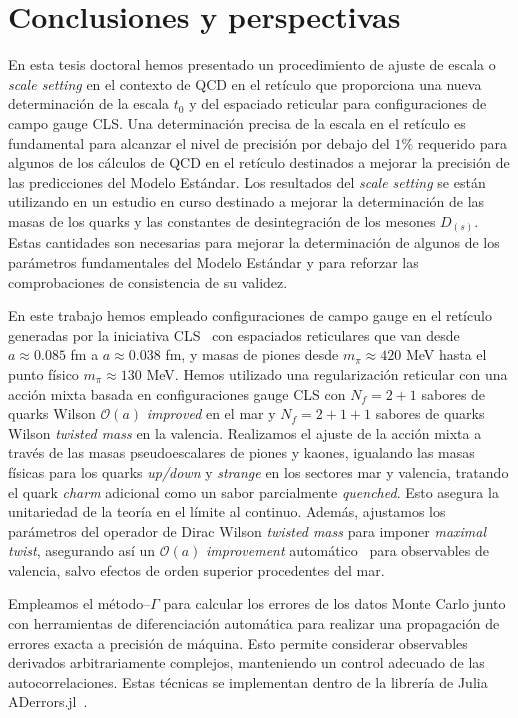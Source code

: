 \chapter*{Conclusiones y perspectivas}

En esta tesis doctoral hemos presentado un procedimiento de ajuste de escala o \textit{scale setting} en el contexto de QCD en el retículo que proporciona una nueva determinación de la escala $t_0$ y del espaciado reticular para configuraciones de campo gauge CLS. Una determinación precisa de la escala en el retículo es fundamental para alcanzar el nivel de precisión por debajo del $1\%$ requerido para algunos de los cálculos de QCD en el retículo destinados a mejorar la precisión de las predicciones del Modelo Estándar. Los resultados del \textit{scale setting} se están utilizando en un estudio en curso destinado a mejorar la determinación de las masas de los quarks y las constantes de desintegración de los mesones $D_{(s)}$. Estas cantidades son necesarias para mejorar la determinación de algunos de los parámetros fundamentales del Modelo Estándar y para reforzar las comprobaciones de consistencia de su validez.

En este trabajo hemos empleado configuraciones de campo gauge en el retículo generadas por la iniciativa CLS~\citep{Bruno:2014jqa,Mohler:2017wnb} con espaciados reticulares que van desde $a\approx0.085$ fm a $a\approx0.038$ fm, y masas de piones desde $m_{\pi}\approx420$ MeV hasta el punto físico $m_{\pi}\approx130$ MeV. Hemos utilizado una regularización reticular con una acción mixta basada en configuraciones gauge CLS con $N_f=2+1$ sabores de quarks Wilson $\mathcal{O}(a)$ \textit{improved} en el mar y $N_f=2+1+1$ sabores de quarks Wilson \textit{twisted mass} en la valencia. Realizamos el ajuste de la acción mixta a través de las masas pseudoescalares de piones y kaones, igualando las masas físicas para los quarks \textit{up/down} y \textit{strange} en los sectores mar y valencia, tratando el quark \textit{charm} adicional como un sabor parcialmente \textit{quenched}. Esto asegura la unitariedad de la teoría en el límite al continuo. Además, ajustamos los parámetros del operador de Dirac Wilson \textit{twisted mass} para imponer \textit{maximal twist}, asegurando así un $\mathcal{O}(a)$ \textit{improvement} automático~\citep{Frezzotti:2003ni,Shindler:2007vp} para observables de valencia, salvo efectos de orden superior procedentes del mar.

Empleamos el método--$\Gamma$ para calcular los errores de los datos Monte Carlo junto con herramientas de diferenciación automática para realizar una propagación de errores exacta a precisión de máquina. Esto permite considerar observables derivados arbitrariamente complejos, manteniendo un control adecuado de las autocorrelaciones. Estas técnicas se implementan dentro de la librería de Julia ADerrors.jl~\citep{Ramos:2018vgu,Ramos:2020scv}. 

